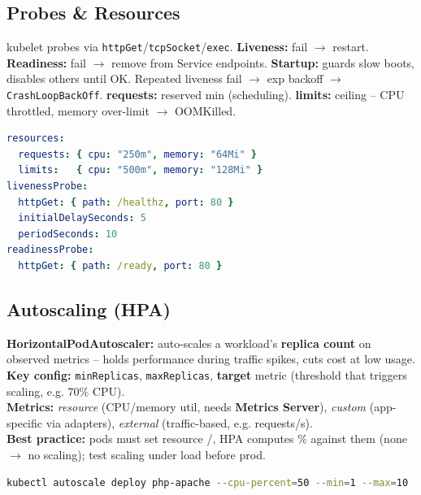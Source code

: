 \subsection{Probes \& Resources}
kubelet probes via \texttt{httpGet}/\texttt{tcpSocket}/\texttt{exec}. \textbf{Liveness:} fail $\rightarrow$ restart. \textbf{Readiness:} fail $\rightarrow$ remove from Service endpoints. \textbf{Startup:} guards slow boots, disables others until OK. Repeated liveness fail $\rightarrow$ exp backoff $\rightarrow$ \texttt{CrashLoopBackOff}. \textbf{requests:} reserved min (scheduling). \textbf{limits:} ceiling -- CPU throttled, memory over-limit $\rightarrow$ OOMKilled.
\begin{lstlisting}[language=yaml]
resources:
  requests: { cpu: "250m", memory: "64Mi" }
  limits:   { cpu: "500m", memory: "128Mi" }
livenessProbe:
  httpGet: { path: /healthz, port: 80 }
  initialDelaySeconds: 5
  periodSeconds: 10
readinessProbe:
  httpGet: { path: /ready, port: 80 }
\end{lstlisting}

\subsection{Autoscaling (HPA)}
\textbf{HorizontalPodAutoscaler:} auto-scales a workload's \textbf{replica count} on observed metrics -- holds performance during traffic spikes, cuts cost at low usage. \\
\textbf{Key config:} \texttt{minReplicas}, \texttt{maxReplicas}, \textbf{target} metric (threshold that triggers scaling, e.g. 70\% CPU). \\
\textbf{Metrics:} \textit{resource} (CPU/memory util, needs \textbf{Metrics Server}), \textit{custom} (app-specific via adapters), \textit{external} (traffic-based, e.g. requests/s). \\
\textbf{Best practice:} pods must set resource /, HPA computes \% against them (none $\to$ no scaling); test scaling under load before prod.
\begin{lstlisting}[language=sh]
kubectl autoscale deploy php-apache --cpu-percent=50 --min=1 --max=10
\end{lstlisting}


